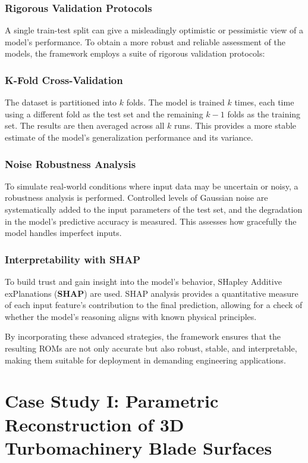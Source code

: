 \documentclass[dscexam, EN]{ufabcFHZh}
\begin{document}
\subsection{Rigorous Validation Protocols}

A single train-test split can give a misleadingly optimistic or pessimistic view of a model's performance. To obtain a more robust and reliable assessment of the models, the framework employs a suite of rigorous validation protocols:

\subsection*{K-Fold Cross-Validation}
The dataset is partitioned into $k$ folds. The model is trained $k$ times, each time using a different fold as the test set and the remaining $k-1$ folds as the training set. The results are then averaged across all $k$ runs. This provides a more stable estimate of the model's generalization performance and its variance.

\subsection*{Noise Robustness Analysis}
To simulate real-world conditions where input data may be uncertain or noisy, a robustness analysis is performed. Controlled levels of Gaussian noise are systematically added to the input parameters of the test set, and the degradation in the model's predictive accuracy is measured. This assesses how gracefully the model handles imperfect inputs.


\subsection*{Interpretability with SHAP}
To build trust and gain insight into the model's behavior, SHapley Additive exPlanations (\textbf{SHAP}) are used. SHAP analysis provides a quantitative measure of each input feature's contribution to the final prediction, allowing for a check of whether the model's reasoning aligns with known physical principles.


By incorporating these advanced strategies, the framework ensures that the resulting ROMs are not only accurate but also robust, stable, and interpretable, making them suitable for deployment in demanding engineering applications.


\chapter{Case Study I: Parametric Reconstruction of 3D Turbomachinery Blade Surfaces}
\end{document}
